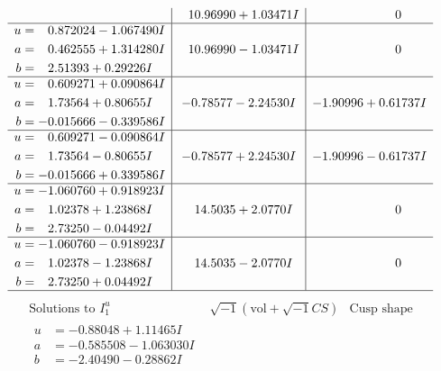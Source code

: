 \documentclass[1p]{elsarticle_modified}
\theoremstyle{definition}
\newcommand{\I}{\sqrt{-1}}
\begin{document}
$$\begin{array}{c|c|c}
 & \phantom{-}10.96990 + 1.03471 I & \phantom{-0.000000 } 0 \\ \hline\begin{aligned}
u &= \phantom{-}0.872024 - 1.067490 I \\
a &= \phantom{-}0.462555 + 1.314280 I \\
b &= \phantom{-}2.51393 + 0.29226 I\end{aligned}
 & \phantom{-}10.96990 - 1.03471 I & \phantom{-0.000000 } 0 \\ \hline\begin{aligned}
u &= \phantom{-}0.609271 + 0.090864 I \\
a &= \phantom{-}1.73564 + 0.80655 I \\
b &= -0.015666 - 0.339586 I\end{aligned}
 & -0.78577 - 2.24530 I & -1.90996 + 0.61737 I \\ \hline\begin{aligned}
u &= \phantom{-}0.609271 - 0.090864 I \\
a &= \phantom{-}1.73564 - 0.80655 I \\
b &= -0.015666 + 0.339586 I\end{aligned}
 & -0.78577 + 2.24530 I & -1.90996 - 0.61737 I \\ \hline\begin{aligned}
u &= -1.060760 + 0.918923 I \\
a &= \phantom{-}1.02378 + 1.23868 I \\
b &= \phantom{-}2.73250 - 0.04492 I\end{aligned}
 & \phantom{-}14.5035 + 2.0770 I & \phantom{-0.000000 } 0 \\ \hline\begin{aligned}
u &= -1.060760 - 0.918923 I \\
a &= \phantom{-}1.02378 - 1.23868 I \\
b &= \phantom{-}2.73250 + 0.04492 I\end{aligned}
 & \phantom{-}14.5035 - 2.0770 I & \phantom{-0.000000 } 0\\
 \hline 
 \end{array}$$\newpage$$\begin{array}{c|c|c}  
\text{Solutions to }I^u_{1}& \I (\text{vol} + \sqrt{-1}CS) & \text{Cusp shape}\\
 \hline 
\begin{aligned}
u &= -0.88048 + 1.11465 I \\
a &= -0.585508 - 1.063030 I \\
b &= -2.40490 - 0.28862 I\end{aligned}

\end{array}$$
\end{document}
